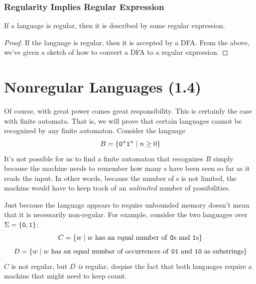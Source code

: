 \documentclass[letterpaper]{article}
\begin{document}
\subsubsection{Regularity Implies Regular Expression}

\begin{lemma}{}{}
    If a language is regular, then it is described by some regular expression.
\end{lemma}

\begin{mdframed}[]
    \begin{proof}
        If the language is regular, then it is accepted by a DFA. From the above, we've given a sketch of how to convert a DFA to a regular expression. 
    \end{proof}
\end{mdframed}









































\newpage 
\section{Nonregular Languages (1.4)}
Of course, with great power comes great responsibility. This is certainly the case with finite automata. That is, we will prove that certain languages cannot be recognized by any finite automaton. Consider the language
\[B = \{\texttt{0}^n \texttt{1}^n \mid n \geq 0\}\]
It's not possible for us to find a finite automaton that recognizes $B$ simply because the machine needs to remember how many s have been seen so far as it reads the input. In other words, because the number of s is not limited, the machine would have to keep track of an \emph{unlimited} number of possibilities.

\begin{note}{}{}
    Just because the language appears to require unbounded memory doesn't mean that it is necessarily non-regular. For example, consider the two languages over $\Sigma = \{\texttt{0}, \texttt{1}\}$: 
    \[C = \{w \mid w \text{ has an equal number of \texttt{0}s and \texttt{1}s}\}\]
    \[D = \{w \mid w \text{ has an equal number of occurrences of \texttt{01} and \texttt{10} as substrings}\}\]
    $C$ is not regular, but $D$ \emph{is} regular, despise the fact that both languages require a machine that might need to keep count. 
\end{note}
\end{document}
